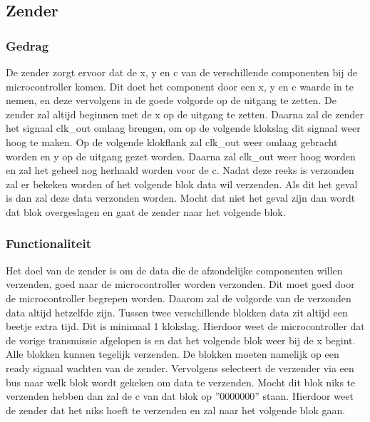 \subsection{Zender}

\subsubsection{Gedrag}
De zender zorgt ervoor dat de x, y en c van de verschillende componenten bij de microcontroller komen. Dit doet het component door een x, y en c waarde in te nemen, en deze vervolgens in de goede volgorde op de uitgang te zetten. De zender zal altijd beginnen met de x op de uitgang te zetten. Daarna zal de zender het signaal clk\_out omlaag brengen, om op de volgende klokslag dit signaal weer hoog te maken. Op de volgende klokflank zal clk\_out weer omlaag gebracht worden en y op de uitgang gezet worden. Daarna zal clk\_out weer hoog worden en zal het geheel nog herhaald worden voor de c. Nadat deze reeks is verzonden zal er bekeken worden of het volgende blok data wil verzenden. Als dit het geval is dan zal deze data verzonden worden. Mocht dat niet het geval zijn dan wordt dat blok overgeslagen en gaat de zender naar het volgende blok.

\subsubsection{Functionaliteit}
Het doel van de zender is om de data die de afzondelijke componenten willen verzenden, goed naar de microcontroller worden verzonden. Dit moet goed door de microcontroller begrepen worden. Daarom zal de volgorde van de verzonden data altijd hetzelfde zijn. Tussen twee verschillende blokken data zit altijd een beetje extra tijd. Dit is minimaal 1 klokslag. Hierdoor weet de microcontroller dat de vorige transmissie afgelopen is en dat het volgende blok weer bij de x begint.\\
Alle blokken kunnen tegelijk verzenden. De blokken moeten namelijk op een ready signaal wachten van de zender. Vervolgens selecteert de verzender via een bus naar welk blok wordt gekeken om data te verzenden. Mocht dit blok niks te verzenden hebben dan zal de c van dat blok op ''0000000'' staan. Hierdoor weet de zender dat het niks hoeft te verzenden en zal naar het volgende blok gaan.

